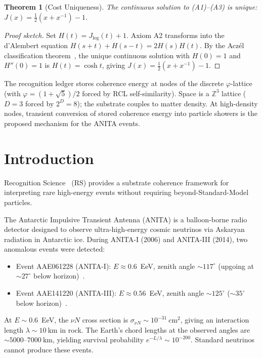 \documentclass[12pt,a4paper]{article}
\newtheorem{theorem}{Theorem}[section]
\theoremstyle{definition}
\theoremstyle{remark}
\begin{document}
\begin{theorem}[Cost Uniqueness]
\label{thm:unique}
The continuous solution to \textup{(A1)--(A3)} is unique:
$J(x) = \tfrac{1}{2}(x + x^{-1}) - 1$.
\end{theorem}

\begin{proof}[Proof sketch]
Set $H(t) = J_{\log}(t)+1$.  Axiom A2 transforms into the d'Alembert
equation $H(s+t)+H(s-t)=2H(s)H(t)$.  By the Acz\'el classification
theorem~\cite{Aczel1966}, the unique continuous solution with $H(0)=1$
and $H''(0)=1$ is $H(t)=\cosh t$, giving
$J(x)=\tfrac{1}{2}(x+x^{-1})-1$.
\end{proof}

\noindent The recognition ledger stores coherence energy at nodes of the
discrete $\varphi$-lattice (with $\varphi=(1+\sqrt{5})/2$ forced by RCL
self-similarity).  Space is a $\mathbb{Z}^3$ lattice ($D=3$ forced by
$2^D=8$); the substrate couples to matter density.  At high-density
nodes, transient conversion of stored coherence energy into particle
showers is the proposed mechanism for the ANITA events.

\section{Introduction}
\label{sec:intro}

Recognition Science~\cite{RS_Axioms} (RS) provides a substrate
coherence framework for interpreting rare high-energy events without
requiring beyond-Standard-Model particles.

The Antarctic Impulsive Transient Antenna (ANITA) is a balloon-borne
radio detector designed to observe ultra-high-energy cosmic neutrinos
via Askaryan radiation in Antarctic ice.  During ANITA-I (2006) and
ANITA-III (2014), two anomalous events were detected:

\begin{itemize}[nosep]
  \item Event AAE061228 (ANITA-I): $E \approx 0.6$~EeV, zenith angle
  $\sim 117^\circ$ (upgoing at $\sim 27^\circ$ below
  horizon)~\cite{ANITA2016}.
  \item Event AAE141220 (ANITA-III): $E \approx 0.56$~EeV, zenith
  angle $\sim 125^\circ$ ($\sim 35^\circ$ below
  horizon)~\cite{ANITA2018}.
\end{itemize}

At $E \sim 0.6$~EeV, the $\nu N$ cross section is
$\sigma_{\nu N} \sim 10^{-31}~\mathrm{cm}^2$, giving an interaction
length $\lambda \sim 10~\mathrm{km}$ in rock.  The Earth's chord
lengths at the observed angles are $\sim 5000$--$7000~\mathrm{km}$,
yielding survival probability $e^{-L/\lambda} \sim 10^{-200}$.
Standard neutrinos cannot produce these events.
\end{document}
